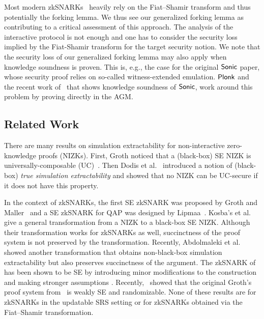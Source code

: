 Most modern zkSNARKs~\cite{SP:BBBPWM18,CCS:MBKM19} heavily
rely on the Fiat--Shamir transform and thus potentially the forking lemma.
We thus see our generalized forking lemma as contributing to a critical assessment of
this approach. The analysis of the interactive protocol is not enough and one
has to consider the security loss implied by the Fiat-Shamir transform for the target security notion.
We note that the security loss of our generalized forking lemma may also apply
when knowledge soundness is proven. This is, e.g., the case for the original
${\textnormal{\textsf{Sonic}}}$ paper, whose security proof relies on so-called witness-extended
emulation. $\textnormal{\textsf{Plonk}}$ and the recent work of~\cite{cryptoeprint:2020:1351} that shows knowledge soundness of
${\textnormal{\textsf{Sonic}}}$, work around this problem by proving directly in the AGM.



\subsection{Related Work}
 

There are many results on simulation extractability for
non-interactive zero-knowledge proofs (NIZKs). First, Groth \cite{AC:Groth07}
noticed that a (black-box) SE NIZK is
universally-composable (UC)~\cite{EPRINT:Canetti00}. Then Dodis et al.~\cite{AC:DHLW10} introduced a
notion of (black-box) \emph{true simulation extractability} and showed that no
NIZK can be UC-secure if it does not have this property. 

In the context of zkSNARKs, the first
SE zkSNARK was proposed by Groth and Maller~\cite{C:GroMal17} and a SE
zkSNARK for QAP was designed by Lipmaa~\cite{EPRINT:Lipmaa19a}.
Kosba's et
al.~\cite{EPRINT:KZMQCP15} give a general transformation from a NIZK to a
black-box SE NIZK. Although their transformation works for zkSNARKs as well,
succinctness of the proof system is not preserved by the transformation.
Recently, Abdolmaleki et al.~\cite{CCS:AbdRamSla20} showed another transformation that
obtains non-black-box simulation extractability but also preserves
succinctness of the argument. 
The zkSNARK of~\cite{EC:Groth16} has been shown to be SE by introducing minor modifications to the construction and making
stronger assumptions \cite{EPRINT:BowGab18,EPRINT:AtaBag19}. Recently,~\cite{EPRINT:BKSV20} showed that the
original Groth's proof system from~\cite{EC:Groth16} is weakly SE and
randomizable. None of these results are for zkSNARKs in the updatable SRS setting or for zkSNARKs obtained via the Fiat--Shamir transformation.

